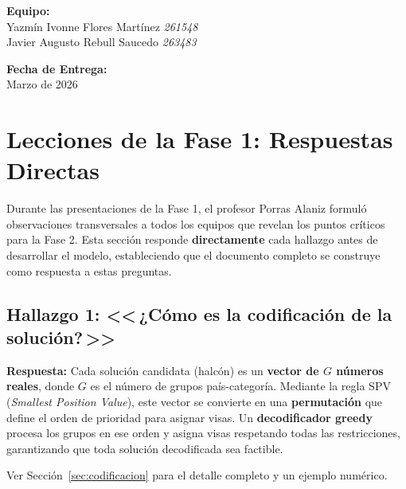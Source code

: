 \documentclass[12pt,letterpaper]{article}
\begin{document}
\begin{titlepage}
\begin{center}
    \vfill

    {\normalsize\textbf{Equipo:}}\\[6pt]
    {\normalsize Yazmín Ivonne Flores Martínez \textcolor{uacjgray}{\textbullet} \textit{261548}}\\[3pt]
    {\normalsize Javier Augusto Rebull Saucedo \textcolor{uacjgray}{\textbullet} \textit{263483}}

    \vspace{0.8cm}

    {\normalsize\textbf{Fecha de Entrega:}}\\[4pt]
    {\normalsize Marzo de 2026}

    \vspace{1.0cm}

\end{center}
\end{titlepage}

\tableofcontents
\newpage

\section{Lecciones de la Fase 1: Respuestas Directas}

Durante las presentaciones de la Fase 1, el profesor Porras Alaniz formuló observaciones transversales a todos los equipos que revelan los puntos críticos para la Fase 2. Esta sección responde \textbf{directamente} cada hallazgo antes de desarrollar el modelo, estableciendo que el documento completo se construye como respuesta a estas preguntas.

\subsection{\texorpdfstring{Hallazgo 1: <<\,¿Cómo es la codificación de la solución?\,>>}{Hallazgo 1: ¿Cómo es la codificación de la solución?}}

\begin{answerbox}
\textbf{Respuesta:} Cada solución candidata (halcón) es un \textbf{vector de $G$ números reales}, donde $G$ es el número de grupos país-categoría. Mediante la regla SPV (\textit{Smallest Position Value}), este vector se convierte en una \textbf{permutación} que define el orden de prioridad para asignar visas. Un \textbf{decodificador greedy} procesa los grupos en ese orden y asigna visas respetando todas las restricciones, garantizando que toda solución decodificada sea factible.

Ver Sección~\ref{sec:codificacion} para el detalle completo y un ejemplo numérico.
\end{answerbox}
\end{document}
